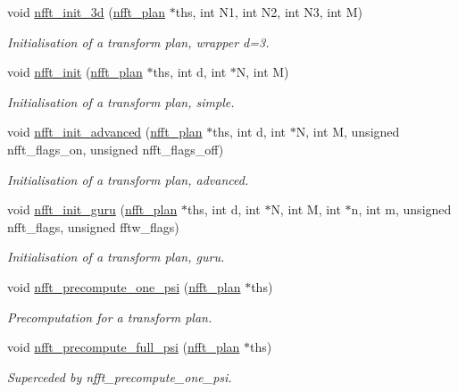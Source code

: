 \begin{CompactItemize}
void \hyperlink{group__nfft_ga6}{nfft\_\-init\_\-3d} (\hyperlink{structnfft__plan}{nfft\_\-plan} $\ast$ths, int N1, int N2, int N3, int M)
\begin{CompactList}\small\item\em Initialisation of a transform plan, wrapper d=3. \item\end{CompactList}\item 
void \hyperlink{group__nfft_ga7}{nfft\_\-init} (\hyperlink{structnfft__plan}{nfft\_\-plan} $\ast$ths, int d, int $\ast$N, int M)
\begin{CompactList}\small\item\em Initialisation of a transform plan, simple. \item\end{CompactList}\item 
void \hyperlink{group__nfft_ga8}{nfft\_\-init\_\-advanced} (\hyperlink{structnfft__plan}{nfft\_\-plan} $\ast$ths, int d, int $\ast$N, int M, unsigned nfft\_\-flags\_\-on, unsigned nfft\_\-flags\_\-off)
\begin{CompactList}\small\item\em Initialisation of a transform plan, advanced. \item\end{CompactList}\item 
void \hyperlink{group__nfft_ga9}{nfft\_\-init\_\-guru} (\hyperlink{structnfft__plan}{nfft\_\-plan} $\ast$ths, int d, int $\ast$N, int M, int $\ast$n, int m, unsigned nfft\_\-flags, unsigned fftw\_\-flags)
\begin{CompactList}\small\item\em Initialisation of a transform plan, guru. \item\end{CompactList}\item 
void \hyperlink{group__nfft_ga10}{nfft\_\-precompute\_\-one\_\-psi} (\hyperlink{structnfft__plan}{nfft\_\-plan} $\ast$ths)
\begin{CompactList}\small\item\em Precomputation for a transform plan. \item\end{CompactList}\item 
void \hyperlink{group__nfft_ga11}{nfft\_\-precompute\_\-full\_\-psi} (\hyperlink{structnfft__plan}{nfft\_\-plan} $\ast$ths)
\begin{CompactList}\small\item\em Superceded by nfft\_\-precompute\_\-one\_\-psi. \item\end{CompactList}\item 

\end{CompactItemize}

